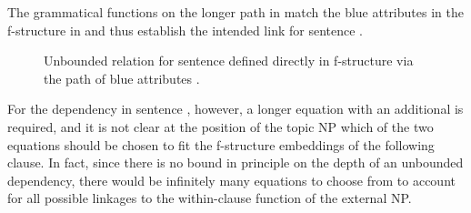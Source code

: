 \documentclass[output=paper,hidelinks]{langscibook}
\begin{document}
\noindent The grammatical functions on the longer path in  match the blue attributes in the f-structure in  and thus establish the intended link for sentence .
%
\begin{figure}[tb]
\hsp{-2em}
\caption{Unbounded relation for sentence  defined directly in f-structure via the path of blue attributes \citep[after][]{kaplzaen89}. }
\label{tree2fu}
\end{figure}


For the dependency in sentence , however, a longer equation with an additional \XCOMP is required, and it is not clear at the position of the topic NP which of the two equations should be chosen to fit the f-structure embeddings of the following clause. In fact, since there is no bound in principle on the depth of an unbounded dependency, there would be infinitely many equations to choose from to account for all possible linkages to the within-clause function of the external NP.
\end{document}
